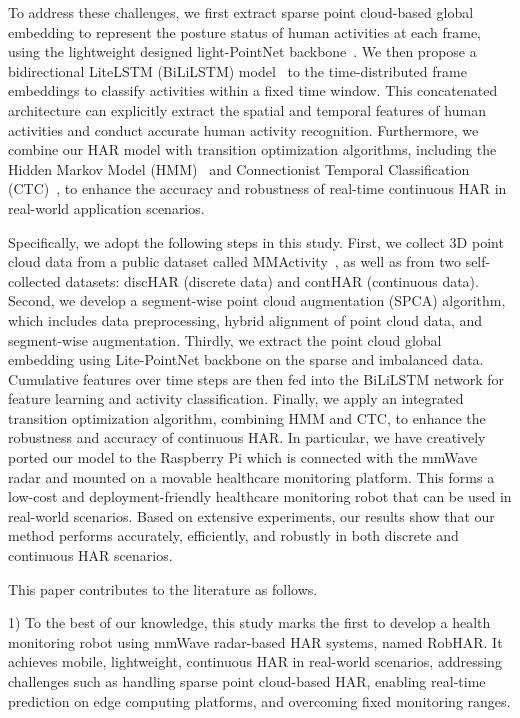 To address these challenges, we first extract sparse point cloud-based global embedding to represent the posture status of human activities at each frame, using the lightweight designed light-PointNet backbone~\cite{han2024mamba3d}. 
We then propose a bidirectional LiteLSTM (BiLiLSTM) model~\cite{elsayed2022litelstm} to the time-distributed frame embeddings to classify activities within a fixed time window. 
This concatenated architecture can explicitly extract the spatial and temporal features of human activities and conduct accurate human activity recognition. 
Furthermore, we combine our HAR model with transition optimization algorithms, including the Hidden Markov Model (HMM)~\cite{eddy1996hidden}
and Connectionist Temporal Classification (CTC)~\cite{graves2006connectionist}, to enhance the accuracy and robustness of real-time continuous HAR in real-world application scenarios. 

Specifically, we adopt the following steps in this study. 
First, we collect 3D point cloud data from a public dataset called MMActivity~\cite{singh2019radhar}, as well as from two self-collected datasets: discHAR (discrete data) and contHAR (continuous data).
Second, we develop a segment-wise point cloud augmentation (SPCA) algorithm, which includes data preprocessing, hybrid alignment of point cloud data, and segment-wise augmentation. 
Thirdly, we extract the point cloud global embedding using Lite-PointNet backbone on the sparse and imbalanced data. 
Cumulative features over time steps are then fed into the BiLiLSTM network for feature learning and activity classification. Finally, we apply an integrated transition optimization algorithm, combining HMM and CTC, to enhance the robustness and accuracy of continuous HAR. 
In particular, we have creatively ported our model to the Raspberry Pi which is connected with the mmWave radar and mounted on a movable healthcare monitoring platform. This forms a low-cost and deployment-friendly healthcare monitoring robot that can be used in real-world scenarios. 
Based on extensive experiments, our results show that our method performs accurately, efficiently, and robustly in both discrete and continuous HAR scenarios.

This paper contributes to the literature as follows.

\par
1) To the best of our knowledge, this study marks the first to develop a health monitoring robot using mmWave radar-based HAR systems, named RobHAR. 
It achieves mobile, lightweight, continuous HAR in real-world scenarios, addressing challenges such as handling sparse point cloud-based HAR, enabling real-time prediction on edge computing platforms, and overcoming fixed monitoring ranges.


